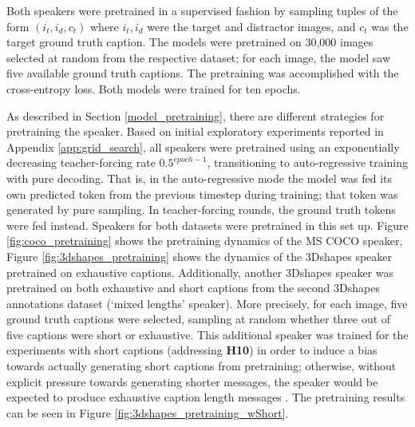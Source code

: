 Both speakers were pretrained in a supervised fashion by sampling tuples of the form $(i_t, i_d, c_t)$ where $i_t, i_d$ were the target and distractor images, and $c_t$ was the target ground truth caption. The models were pretrained on 30,000 images selected at random from the respective dataset; for each image, the model saw five available ground truth captions. 
The pretraining was accomplished with the cross-entropy loss. Both models were trained for ten epochs.

As described in Section \ref{model_pretraining}, there are different strategies for pretraining the speaker. Based on initial exploratory experiments reported in Appendix \ref{app:grid_search}, all speakers were pretrained using an exponentially decreasing teacher-forcing rate $0.5^{epoch-1}$, transitioning to auto-regressive training with pure decoding. That is, in the auto-regressive mode the model was fed its own predicted token from the previous timestep during training; that token was generated by pure sampling. In teacher-forcing rounds, the ground truth tokens were fed instead.
Speakers for both datasets were pretrained in this set up. Figure \ref{fig:coco_pretraining} shows the pretraining dynamics of the MS COCO speaker, Figure \ref{fig:3dshapes_pretraining} shows the dynamics of the 3Dshapes speaker pretrained on exhaustive captions. Additionally, another 3Dshapes speaker was pretrained on both exhaustive and short captions from the second 3Dshapes annotations dataset (`mixed lengths' speaker). More precisely, for each image, five ground truth captions were selected, sampling at random whether three out of five captions were short or exhaustive. This additional speaker was trained for the experiments with short captions (addressing \textbf{H10}) in order to induce a bias towards actually generating short captions from pretraining; otherwise, without explicit pressure towards generating shorter messages, the speaker would be expected to produce exhaustive caption length messages \parencite[cf., e.~g.,][]{hupkes2020compositionality}. The pretraining results can be seen in Figure \ref{fig:3dshapes_pretraining_wShort}.

